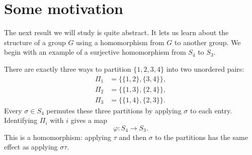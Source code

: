 \documentclass[reqno,11pt]{amsart}
\begin{document}
\raggedbottom
\makelecturetitle

\section{Some motivation}

The next result we will study is quite abstract. It lets us learn about
the structure of a group $G$ using a homomorphism from $G$ to another
group. We begin with an example of a surjective homomorphism from
$S_4$ to $S_3$.

There are exactly three ways to partition $\{1,2,3,4\}$ into two
unordered pairs:
\[
\begin{aligned}
	\Pi_1&=\bigl\{\{1,2\},\{3,4\}\bigr\},\\
	\Pi_2&=\bigl\{\{1,3\},\{2,4\}\bigr\},\\
	\Pi_3&=\bigl\{\{1,4\},\{2,3\}\bigr\}.
\end{aligned}
\]
Every $\sigma\in S_4$ permutes these three partitions by applying
$\sigma$ to each entry. Identifying $\Pi_i$ with $i$ gives a map
\[
\varphi:S_4\longrightarrow S_3.
\]
This is a homomorphism: applying $\tau$ and then $\sigma$ to the
partitions has the same effect as applying $\sigma\tau$.
\end{document}
